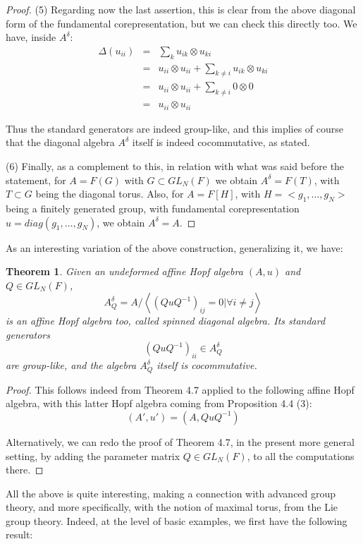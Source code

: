 \documentclass[12pt]{amsbook}
\newtheorem{theorem}{Theorem}[chapter]
\begin{document}
\begin{proof}
(5) Regarding now the last assertion, this is clear from the above diagonal form of the fundamental corepresentation, but we can check this directly too. We have, inside $A^\delta$:
\begin{eqnarray*}
\Delta(u_{ii})
&=&\sum_ku_{ik}\otimes u_{ki}\\
&=&u_{ii}\otimes u_{ii}+\sum_{k\neq i}u_{ik}\otimes u_{ki}\\
&=&u_{ii}\otimes u_{ii}+\sum_{k\neq i}0\otimes0\\
&=&u_{ii}\otimes u_{ii}
\end{eqnarray*}

Thus the standard generators are indeed group-like, and this implies of course that the diagonal algebra $A^\delta$ itself is indeed cocommutative, as stated.

\medskip

(6) Finally, as a complement to this, in relation with what was said before the statement, for $A=F(G)$ with $G\subset GL_N(F)$ we obtain $A^\delta=F(T)$, with $T\subset G$ being the diagonal torus. Also, for $A=F[H]$, with $H=<g_1,\ldots,g_N>$ being a finitely generated group, with fundamental corepresentation $u=diag(g_1,\ldots,g_N)$, we obtain $A^\delta=A$.
\end{proof}

As an interesting variation of the above construction, generalizing it, we have:


\begin{theorem}
Given an undeformed affine Hopf algebra $(A,u)$ and $Q\in GL_N(F)$,
$$A^\delta_Q=A\Big/\left<(QuQ^{-1})_{ij}=0\Big|\forall i\neq j\right>$$
is an affine Hopf algebra too, called spinned diagonal algebra. Its standard generators 
$$(QuQ^{-1})_{ii}\in A^\delta_Q$$
are group-like, and the algebra $A^\delta_Q$ itself is cocommutative.
\end{theorem}

\begin{proof}
This follows indeed from Theorem 4.7 applied to the following affine Hopf algebra, with this latter Hopf algebra coming from Proposition 4.4 (3):
$$(A',u')=(A,QuQ^{-1})$$

Alternatively, we can redo the proof of Theorem 4.7, in the present more general setting, by adding the parameter matrix $Q\in GL_N(F)$, to all the computations there.
\end{proof}

All the above is quite interesting, making a connection with advanced group theory, and more specifically, with the notion of maximal torus, from the Lie group theory. Indeed, at the level of basic examples, we first have the following result:
\end{document}
